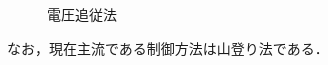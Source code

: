 \begin{enumerate}[(1)]
\begin{enumerate}
\begin{figure}[h]
		\caption{電圧追従法\cite{nvdfsjknv}}
		\label{fig:area}
		\end{figure}
		\end{enumerate}
		なお，現在主流である制御方法は山登り法である\cite{main}．
\end{enumerate}